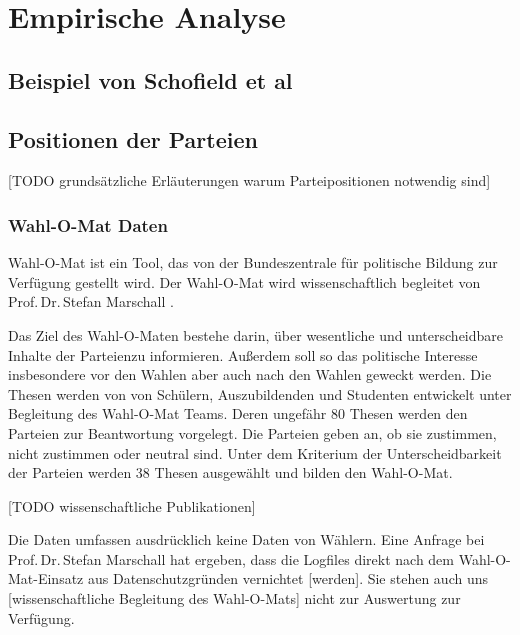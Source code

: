 
\chapter{Empirische Analyse}\label{Kap-Empirische-Analyse}

\section{Beispiel von Schofield et al}

\blindtext[3]

\section{Positionen der Parteien}\label{Sec-Parteienpositionen}

[TODO grundsätzliche Erläuterungen warum Parteipositionen notwendig sind]

\subsection{Wahl-O-Mat Daten}
Wahl-O-Mat \citep{WahlOMat} ist ein Tool, das von der Bundeszentrale für politische Bildung zur Verfügung gestellt wird. Der Wahl-O-Mat wird wissenschaftlich begleitet von Prof.\,Dr.\,Stefan Marschall \citep{MarschallWahlOMat}.

Das Ziel des Wahl-O-Maten bestehe darin, über \glqq wesentliche und unterscheidbare Inhalte der Parteien\grqq zu informieren. Außerdem soll so das politische Interesse insbesondere vor den Wahlen aber auch nach den Wahlen geweckt werden. 
Die Thesen werden von von Schülern, Auszubildenden und Studenten entwickelt unter Begleitung des Wahl-O-Mat Teams. Deren ungefähr 80 Thesen werden den Parteien zur Beantwortung vorgelegt. Die Parteien geben an, ob sie zustimmen, nicht zustimmen oder neutral sind. Unter dem Kriterium der Unterscheidbarkeit der Parteien werden  38 Thesen ausgewählt und bilden den Wahl-O-Mat. %

[TODO wissenschaftliche Publikationen]

Die Daten umfassen ausdrücklich keine Daten von Wählern. Eine Anfrage bei Prof.\,Dr.\,Stefan Marschall hat ergeben, dass \glqq die Logfiles direkt nach dem Wahl-O-Mat-Einsatz aus Datenschutzgründen vernichtet [werden]. Sie stehen auch uns [wissenschaftliche Begleitung des Wahl-O-Mats] nicht zur Auswertung zur Verfügung.\grqq

